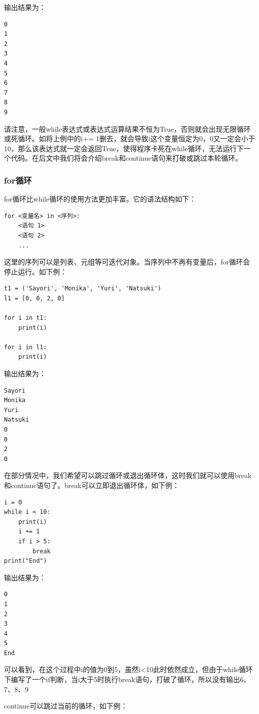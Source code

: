 \documentclass[../../Main.tex]{subfiles}
\begin{document}
输出结果为：
\begin{lstlisting}
0
1
2
3
4
5
6
7
8
9
\end{lstlisting}

\begin{Warning}
    请注意，一般while表达式或表达式运算结果不恒为True，否则就会出现无限循环或死循环。如将上例中的i+= 1删去，就会导致i这个变量恒定为0，0又一定会小于10，那么该表达式就一定会返回True，使得程序卡死在while循环，无法运行下一个代码。在后文中我们将会介绍break和continue语句来打破或跳过本轮循环。
\end{Warning}

\subsubsection{for循环\PyOnly }
for循环比while循环的使用方法更加丰富。它的语法结构如下：
\begin{lstlisting}
for <变量名> in <序列>:
    <语句 1>
    <语句 2>
    ...
\end{lstlisting}

这里的序列可以是列表、元组等可迭代对象。当序列中不再有变量后，for循环会停止运行。如下例：

\begin{lstlisting}
t1 = ('Sayori', 'Monika', 'Yuri', 'Natsuki')
l1 = [0, 0, 2, 0]

for i in t1:
    print(i)

for i in l1:
    print(i)
\end{lstlisting}

输出结果为：
\begin{lstlisting}
Sayori
Monika
Yuri
Natsuki
0
0
2
0
\end{lstlisting}

在部分情况中，我们希望可以跳过循环或退出循环体，这时我们就可以使用break和continue语句了。break可以立即退出循环体，如下例：

\begin{lstlisting}
i = 0
while i < 10:
    print(i)
    i += 1
    if i > 5:
        break
print("End")
\end{lstlisting}

输出结果为：
\begin{lstlisting}
0
1
2
3
4
5
End
\end{lstlisting}

可以看到，在这个过程中i的值为0到5，虽然i<10此时依然成立，但由于while循环下编写了一个if判断，当i大于5时执行break语句，打破了循环，所以没有输出6、7、8、9

continue可以跳过当前的循环，如下例：
\end{document}
